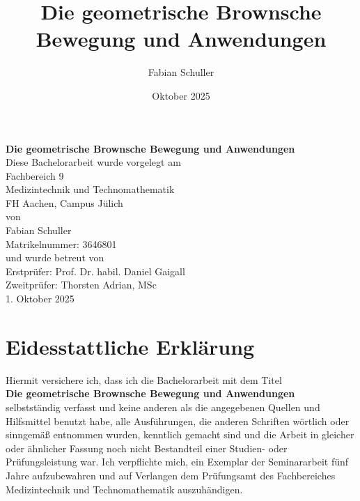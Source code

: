 \documentclass{article}
\title{Die geometrische Brownsche Bewegung und Anwendungen}
\author{Fabian Schuller}
\date{Oktober 2025}
\theoremstyle{mystyle}
\begin{document}

\begin{center}
    \vspace*{2cm}
    {\LARGE \textbf{Die geometrische Brownsche Bewegung und Anwendungen}}\\[2cm]

    {\large Diese Bachelorarbeit wurde vorgelegt am\\[0.5cm]
    
    Fachbereich 9 \\[0.3cm]
    Medizintechnik und Technomathematik\\[0.3cm]
    FH Aachen, Campus Jülich\\[0.9cm]
   

    von\\[0.9cm]
    Fabian Schuller\\
    Matrikelnummer: 3646801\\[0.9cm]

    und wurde betreut von\\[0.9cm]

    Erstprüfer: Prof. Dr. habil. Daniel Gaigall\\[0.3cm]
    Zweitprüfer: Thorsten Adrian, MSc\\[2cm]
}
    1. Oktober 2025

    \vfill
\end{center}

\thispagestyle{empty}

\newpage

\section*{Eidesstattliche Erklärung}

\noindent
Hiermit versichere ich, dass ich die Bachelorarbeit mit dem Titel \\[0.5cm] \textbf{Die geometrische Brownsche Bewegung und Anwendungen} \\[0.5cm]selbstständig verfasst und keine anderen als die angegebenen Quellen und Hilfsmittel benutzt habe, alle Ausführungen, die anderen Schriften wörtlich oder sinngemäß entnommen wurden, kenntlich gemacht sind und die Arbeit in gleicher oder ähnlicher Fassung noch nicht Bestandteil einer Studien- oder Prüfungsleistung war. Ich verpflichte mich, ein Exemplar der Seminararbeit fünf Jahre aufzubewahren und auf Verlangen dem Prüfungsamt des Fachbereiches Medizintechnik und Technomathematik auszuhändigen.
\\[2cm]
\end{document}
